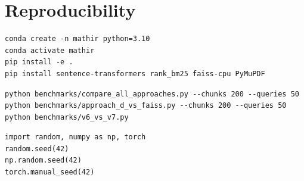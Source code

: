 \documentclass[12pt,a4paper]{article}
\theoremstyle{definition}
\theoremstyle{remark}
\begin{document}
\section{Reproducibility}
\label{app:repro}

\begin{lstlisting}[style=python, caption={Environment setup.}]
conda create -n mathir python=3.10
conda activate mathir
pip install -e .
pip install sentence-transformers rank_bm25 faiss-cpu PyMuPDF
\end{lstlisting}

\begin{lstlisting}[style=python, caption={Running benchmarks.}]
python benchmarks/compare_all_approaches.py --chunks 200 --queries 50
python benchmarks/approach_d_vs_faiss.py --chunks 200 --queries 50
python benchmarks/v6_vs_v7.py
\end{lstlisting}

\begin{lstlisting}[style=python, caption={Random seed.}]
import random, numpy as np, torch
random.seed(42)
np.random.seed(42)
torch.manual_seed(42)
\end{lstlisting}
\end{document}
